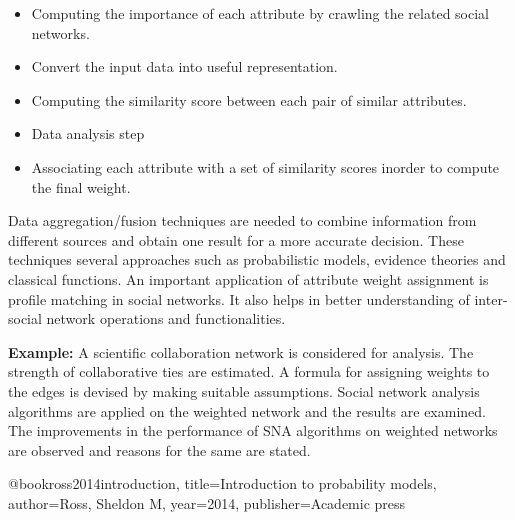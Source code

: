 \begin{itemize}
\item Computing the importance of each attribute by crawling the related social networks.
\item Convert the input data into useful representation.
\item Computing the similarity score between each pair of similar attributes.
\item Data analysis step
\item Associating each attribute with a set of similarity scores inorder to compute the final weight.
\end{itemize}

Data aggregation/fusion techniques are needed to combine information from different sources and obtain one result for a more accurate decision. These techniques several approaches such as probabilistic models, evidence theories and classical functions. An important application of attribute weight assignment is profile matching in social networks.  It also helps in better understanding of inter-social network operations and functionalities. \cite{Raad2010}

{\bf Example:}
A scientific collaboration network is considered for analysis. The strength of collaborative ties are estimated. A formula for assigning weights to the edges is devised by making suitable assumptions. Social network analysis algorithms are applied on the weighted network and the results are examined. The improvements in the performance of SNA algorithms on weighted networks are observed and reasons for the same are stated. \cite{Newman2001}

@book{ross2014introduction,
  title={Introduction to probability models},
  author={Ross, Sheldon M},
  year={2014},
  publisher={Academic press}
}
